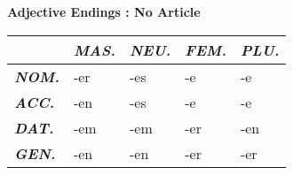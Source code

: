 \documentclass[a4paper,twocolumn,10pt]{article}
\newcommand{\tabularxtable}[3]
{

	\vspace{0.5cm}
	\nolinenumbers

	\begin{tabularx}{#1}{#2}
		#3
	\end{tabularx}

	\linenumbers
	\vspace{0.5cm}
}
\begin{document}
\textbf {Adjective Endings : No Article}
\tabularxtable
{0.99\linewidth}
{l|XXXX}
{

&
\cellcolor{table-subtopic} \textbf{\textit{MAS.}} &
\cellcolor{table-subtopic} \textbf{\textit{NEU.}}  &
\cellcolor{table-subtopic} \textbf{\textit{FEM.}}  &
\cellcolor{table-subtopic} \textbf{\textit{PLU.}} \\
\midrule

\cellcolor{table-subtopic} \textbf{\textit{NOM.}} &
\cellcolor{cell-lightgreen}   -er             &
\cellcolor{cell-lightorange} -es             &
\cellcolor{cell-lightred}    -e              &
\cellcolor{cell-lightred}   -e\\

\cellcolor{table-subtopic} \textbf{\textit{ACC.}} &
\cellcolor{cell-lightblue}   -en             &
\cellcolor{cell-lightorange} -es             &
\cellcolor{cell-lightred}    -e              &
\cellcolor{cell-lightred}   -e \\

\cellcolor{table-subtopic} \textbf{\textit{DAT.}} &
\cellcolor{cell-lightyellow} -em               &
\cellcolor{cell-lightyellow} -em               &
\cellcolor{cell-lightgreen} -er              &
\cellcolor{cell-lightblue} -en \\

\cellcolor{table-subtopic} \textbf{\textit{GEN.}} &
\cellcolor{cell-lightblue} -en               &
\cellcolor{cell-lightblue} -en               &
\cellcolor{cell-lightgreen} -er               &
\cellcolor{cell-lightgreen} -er \\




}


\pagebreak

\end{document}
